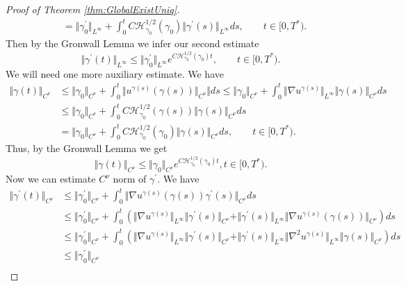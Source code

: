 \documentclass[11pt,a4paper,reqno]{amsart}%
\theoremstyle{plain}
\theoremstyle{remark}
\theoremstyle{plain}
\numberwithin{equation}{section}
\begin{document}
\begin{proof}[Proof of Theorem \ref{thm:GlobalExistUniq}]
\begin{align}
&=\Vert \gamma^\prime_0\Vert_{L^{\infty}}+\int_0^t C\mathcal{H}_{\gamma_0}^{1/2}(\gamma_0)\Vert \gamma^\prime(s)\Vert_{L^{\infty}}ds,\qquad t\in[0,T^*).
\end{align}
Then by the Gronwall Lemma we infer our second estimate
\begin{equation}
\Vert \gamma^\prime(t)\Vert_{L^{\infty}}\leq\Vert \gamma^\prime_0\Vert_{L^{\infty}}e^{C\mathcal{H}_{\gamma_0}^{1/2}(\gamma_0)t},\qquad t\in[0,T^*).\label{eqn:GEUEstim-2}
\end{equation}
We will need one more auxiliary estimate. We have
\begin{align}
\Vert \gamma(t)\Vert_{C^{\nu}}&\leq\Vert \gamma_0\Vert_{C^{\nu}}+\int_0^t\Vert
u^{\gamma(s)}(\gamma(s))\Vert_{C^{\nu}}\Vert ds
\leq\Vert \gamma_0\Vert_{C^{\nu}}+\int_0^t\Vert \nabla
u^{\gamma(s)}\Vert_{L^{\infty}}\Vert \gamma(s)\Vert_{C^{\nu}}ds\nonumber\\
&\leq
\Vert \gamma_0\Vert_{C^{\nu}}+\int_0^tC\mathcal{H}_{\gamma_0}^{1/2}(\gamma(s))\Vert \gamma(s)\Vert_{C^{\nu}}ds\nonumber\\
&=\Vert \gamma_0\Vert_{C^{\nu}}+\int_0^tC\mathcal{H}_{\gamma_0}^{1/2}(\gamma_0)\Vert \gamma(s)\Vert_{C^{\nu}}ds,\qquad t\in[0,T^*).
\end{align}
Thus, by the Gronwall Lemma we get
\begin{equation}
\Vert \gamma(t)\Vert_{C^{\nu}}\leq\Vert \gamma_0\Vert_{C^{\nu}}e^{C\mathcal{H}_{\gamma_0}^{1/2}(\gamma_0)t},t\in[0,T^*).\label{eqn:GEUEstim-aux}
\end{equation}
Now we can estimate $C^{\nu}$ norm of $\gamma^\prime$. We have
\begin{align}
\Vert \gamma^\prime(t)\Vert_{C^{\nu}}&\leq\Vert \gamma^\prime_0\Vert_{C^{\nu}}+\int_0^t\Vert \nabla
u^{\gamma(s)}(\gamma(s))\gamma^\prime(s)\Vert_{C^{\nu}}ds\nonumber\\
&\leq \Vert \gamma^\prime_0\Vert_{C^{\nu}}+\int_0^t(\Vert \nabla
u^{\gamma(s)}\Vert_{L^{\infty}}\Vert \gamma^\prime(s)\Vert_{C^{\nu}}+\Vert \gamma^\prime(s)\Vert_{L^{\infty}}\Vert \nabla
u^{\gamma(s)}(\gamma(s))\Vert_{C^{\nu}})ds\nonumber\\
&\leq\Vert \gamma^\prime_0\Vert_{C^{\nu}}+\int_0^t(\Vert \nabla
u^{\gamma(s)}\Vert_{L^{\infty}}\Vert \gamma^\prime(s)\Vert_{C^{\nu}}+\Vert \gamma^\prime(s)\Vert_{L^{\infty}}\Vert \nabla^2
u^{\gamma(s)}\Vert_{L^{\infty}}\Vert \gamma(s)\Vert_{C^{\nu}})ds\nonumber\\
&\leq\Vert \gamma^\prime_0\Vert_{C^{\nu}}\nonumber\\

\end{align}
\end{proof}
\end{document}
